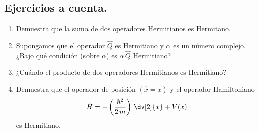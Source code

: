 \subsection{Ejercicios a cuenta.}

\begin{enumerate}
\item Demuestra que la suma de dos operadores Hermitianos es Hermitano.
\item Supongamos que el operador $\hat{Q}$ es Hermitiano y $\alpha$ es un número complejo. ¿Bajo qué condición (sobre $\alpha$) es $\alpha \, \hat{Q}$ Hermitiano?
\item ¿Cuándo el producto de dos operadores Hermitianos es Hermitiano?
\item Demuestra que el operador de posición $(\hat{x} = x)$ y el operador Hamiltoniano
\begin{align*}
\hat{H} = - \left( \dfrac{\hbar^{2}}{2 \, m} \right) \, \dv[2]{x} + V(x)
\end{align*}
es Hermitiano.
\end{enumerate}
